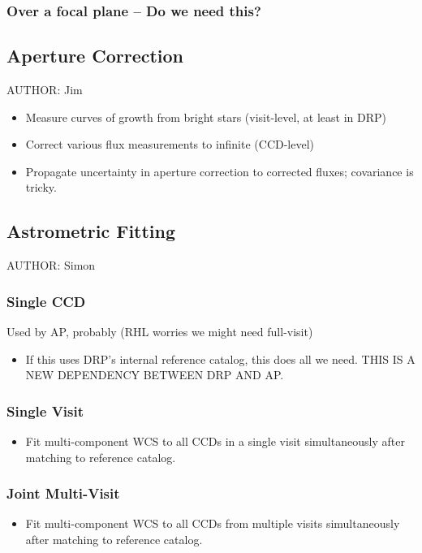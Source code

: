 \subsubsection{Over a focal plane -- Do we need this?}

\subsection{Aperture Correction}
\label{sec:acApCorr}
AUTHOR: Jim
\begin{itemize}
\item Measure curves of growth from bright stars (visit-level, at least in DRP)
\item Correct various flux measurements to infinite (CCD-level)
\item Propagate uncertainty in aperture correction to corrected fluxes; covariance is tricky.
\end{itemize}

\subsection{Astrometric Fitting}
\label{sec:acAstrometricFitting}
AUTHOR: Simon
\subsubsection{Single CCD}
\label{sec:acSingleCCDAstrometricFit}
Used by AP, probably (RHL worries we might need full-visit)
\begin{itemize}
\item If this uses DRP's internal reference catalog, this does all we need. THIS IS A NEW DEPENDENCY BETWEEN DRP AND AP.
\end{itemize}
\subsubsection{Single Visit}
\label{sec:acSingleVisitAstrometricFit}
\begin{itemize}
\item Fit multi-component WCS to all CCDs in a single visit simultaneously after matching to reference catalog.
\end{itemize}
\subsubsection{Joint Multi-Visit}
\label{sec:acJointAstrometicFit}
\begin{itemize}
\item Fit multi-component WCS to all CCDs from multiple visits simultaneously after matching to reference catalog.
\end{itemize}

